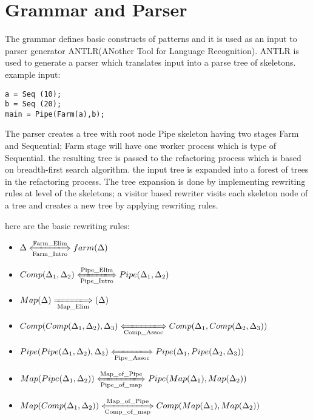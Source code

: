 \documentclass[12pt]{report}
\begin{document}
	
\title{}

\maketitle

\section{Grammar and Parser}
The grammar defines basic constructs of patterns and it is used as an input to parser generator ANTLR(ANother Tool for Language Recognition). ANTLR is used to generate a parser which translates input into a parse tree of skeletons. example input:

\begin{lstlisting}[style=refactor, caption={example input program},label={lst:code1}]
a = Seq (10);
b = Seq (20);
main = Pipe(Farm(a),b);
\end{lstlisting}
The parser creates a tree with root node Pipe skeleton having two stages Farm and Sequential; Farm stage will have one worker process which is type of Sequential. the resulting tree is passed to the refactoring process which is based on  breadth-first search algorithm. the input tree is expanded into a forest of trees in the refactoring process. The tree expansion is done by implementing rewriting rules at level of the skeletons; a visitor based rewriter visits each skeleton node of a tree  and creates a new tree by applying rewriting rules. 

here are the basic rewriting rules:

\begin{itemize}
\item $\Delta \xLongleftrightarrow[\text{Farm\_Intro}]{\text{Farm\_Elim}} farm (\Delta)$\\
\item $Comp(\Delta_1, \Delta_2 )\xLongleftrightarrow[\text{Pipe\_Intro}]{\text{Pipe\_Elim}} Pipe (\Delta_1,\Delta_2)$\\
\item $Map(\Delta) \xLongrightarrow[\text{Map\_Elim}]{\text{}}  (\Delta)$\\
\item $Comp(Comp(\Delta_1, \Delta_2 ),\Delta_3)\xLongleftrightarrow[\text{Comp\_Assoc}]{\text{}} Comp (\Delta_1,Comp(\Delta_2,\Delta_3))$\\
\item $Pipe(Pipe(\Delta_1, \Delta_2 ),\Delta_3)\xLongleftrightarrow[\text{Pipe\_Assoc}]{\text{}} Pipe (\Delta_1,Pipe(\Delta_2,\Delta_3))$\\
\item $Map(Pipe(\Delta_1, \Delta_2 ))\xLongleftrightarrow[\text{Pipe\_of\_map}]{\text{Map\_of\_Pipe}} Pipe (Map(\Delta_1),Map(\Delta_2))$\\
\item $Map(Comp(\Delta_1, \Delta_2 ))\xLongleftrightarrow[\text{Comp\_of\_map}]{\text{Map\_of\_Pipe}} Comp (Map(\Delta_1),Map(\Delta_2))$\\
\end{itemize}
\end{document}
